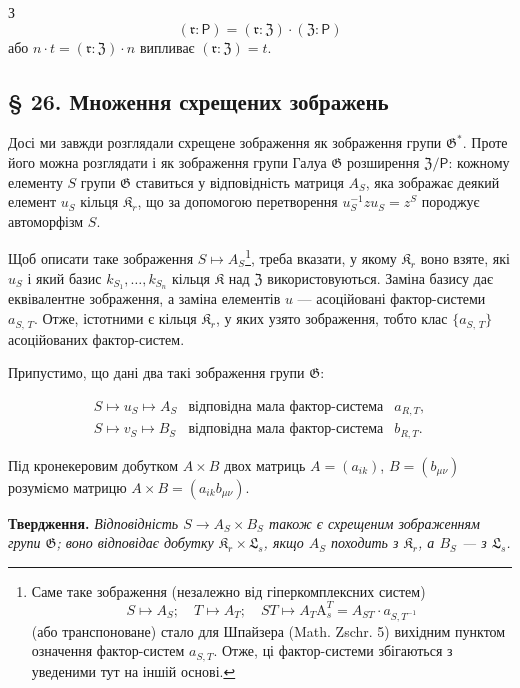 \documentclass[11pt]{article}
\newcommand{\srcfn}[2]{\footnote{#2}}
\begin{document}
З
\[(\mathfrak{r}: \mathsf{P}) = (\mathfrak{r}: \mathfrak Z) \cdot (\mathfrak Z: \mathsf{P})\]
або \(n \cdot t = (\mathfrak{r}: \mathfrak Z) \cdot n\) випливає \((\mathfrak{r}: \mathfrak Z) = t\).

\subsection*{§ 26. Множення схрещених зображень}\label{multiplikation-der-verschraenkten-darstellungen}

Досі ми завжди розглядали схрещене зображення як зображення групи \(\mathfrak{G}^*\). Проте його можна розглядати і як зображення групи Галуа \(\mathfrak{G}\) розширення \(\mathfrak Z/\mathsf{P}\): кожному елементу \(S\) групи \(\mathfrak{G}\) ставиться у відповідність матриця \(A_S\), яка зображає деякий елемент \(u_S\) кільця \(\mathfrak K_r\), що за допомогою перетворення \(u_S^{-1}zu_S=z^S\) породжує автоморфізм \(S\).

Щоб описати таке зображення \(S\mapsto A_S\)\srcfn{1}{Саме таке зображення (незалежно від гіперкомплексних систем)
\[
S\mapsto A_S;\quad T\mapsto A_T;\quad ST\mapsto A_T\mathrm{A}_s^T=A_{ST}\cdot a_{S,T^{-1}}
\]
(або транспоноване) стало для Шпайзера (Math. Zschr. 5) вихідним пунктом означення фактор-систем \(a_{S,T}\). Отже, ці фактор-системи збігаються з уведеними тут на іншій основі.}, треба вказати, у якому \(\mathfrak K_r\) воно взяте, які \(u_S\) і який базис \(k_{S_1},\ldots,k_{S_n}\) кільця \(\mathfrak K\) над \(\mathfrak Z\) використовуються. Заміна базису дає еквівалентне зображення, а заміна елементів \(u\) --- асоційовані фактор-системи \(a_{S,\,T}\). Отже, істотними є кільця \(\mathfrak K_r\), у яких узято зображення, тобто клас \(\{a_{S,\,T}\}\) асоційованих фактор-систем.

Припустимо, що дані два такі зображення групи \(\mathfrak G\):

\[
\begin{array}{lll}
S\mapsto u_S\mapsto A_S & \text{відповідна мала фактор-система} & a_{R,T},\\
S\mapsto v_S\mapsto B_S & \text{відповідна мала фактор-система} & b_{R,T}.
\end{array}
\]

Під кронекеровим добутком \(A\times B\) двох матриць \(A=(a_{ik})\), \(B=(b_{\mu\nu})\) розуміємо матрицю \(A\times B=(a_{ik}b_{\mu\nu})\).

\noindent\textbf{Твердження.} \emph{Відповідність \(S\to A_S\times B_S\) також є схрещеним зображенням групи \(\mathfrak G\); воно відповідає добутку \(\mathfrak K_r\times\mathfrak L_s\), якщо \(A_S\) походить з \(\mathfrak K_r\), а \(B_S\) --- з \(\mathfrak L_s\).}
\end{document}

